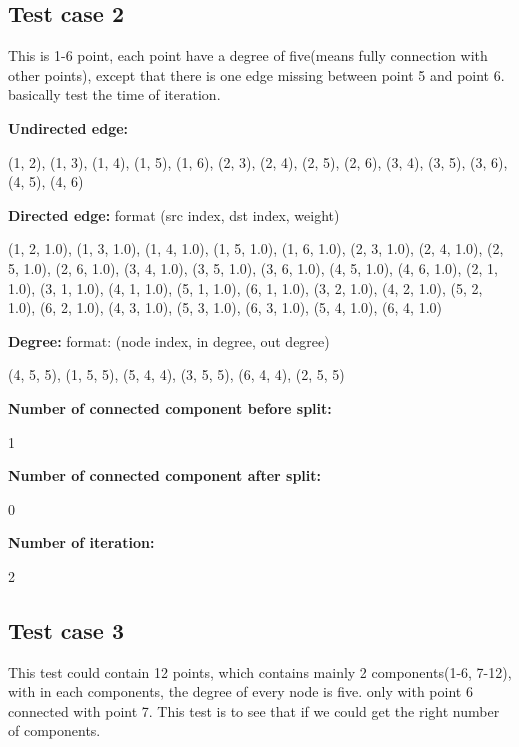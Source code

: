\subsection{Test case 2}
\par This is 1-6 point, each point have a degree of five(means fully connection with other points), except that there is one edge missing between point 5 and point 6. basically test the time of iteration. \\

\par \textbf{Undirected edge:}
\par (1, 2), (1, 3), (1, 4), (1, 5), (1, 6), (2, 3), (2, 4), (2, 5), (2, 6), (3, 4), (3, 5), (3, 6), (4, 5), (4, 6) \\


\par \textbf{Directed edge:}    format (src index, dst index, weight)
\par (1, 2, 1.0), (1, 3, 1.0), (1, 4, 1.0), (1, 5, 1.0), (1, 6, 1.0), (2, 3, 1.0), (2, 4, 1.0), (2, 5, 1.0), (2, 6, 1.0), (3, 4, 1.0), (3, 5, 1.0), (3, 6, 1.0), (4, 5, 1.0), (4, 6, 1.0), (2, 1, 1.0), (3, 1, 1.0), (4, 1, 1.0), (5, 1, 1.0), (6, 1, 1.0), (3, 2, 1.0), (4, 2, 1.0), (5, 2, 1.0), (6, 2, 1.0), (4, 3, 1.0), (5, 3, 1.0), (6, 3, 1.0), (5, 4, 1.0), (6, 4, 1.0) \\

\par \textbf{Degree:}   format: (node index, in degree, out degree)
\par (4, 5, 5), (1, 5, 5), (5, 4, 4), (3, 5, 5), (6, 4, 4), (2, 5, 5) \\

\par \textbf{Number of connected component before split:}
\par 1\\
\par \textbf{Number of connected component after split:}
\par 0\\

\par \textbf{Number of iteration:}
\par 2 \\

\subsection{Test case 3}
\par This test could contain 12 points, which contains mainly 2 components(1-6, 7-12), with in each components, the degree of every node is five. only with point 6 connected with point 7. This test is to see that if we could get the right number of components. \\

